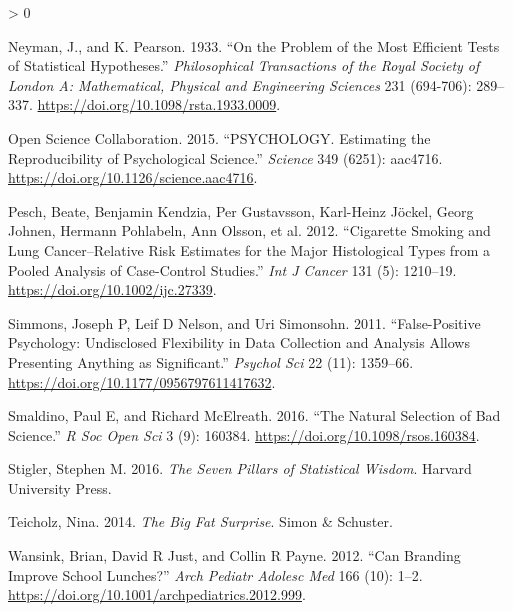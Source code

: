 \documentclass[
  12pt,
]{book}
\newlength{\cslhangindent}
\newenvironment{CSLReferences}[2] %
 {%
  \setlength{\parindent}{0pt}
  \ifodd #1 \everypar{\setlength{\hangindent}{\cslhangindent}}\ignorespaces\fi
  \ifnum #2 > 0
  \setlength{\parskip}{#2\baselineskip}
  \fi
 }%
 {}
\theoremstyle{definition}
\theoremstyle{definition}
\theoremstyle{definition}
\theoremstyle{remark}
\begin{document}
\begin{CSLReferences}{1}{0}
\leavevmode\hypertarget{ref-Neyman289}{}%
Neyman, J., and K. Pearson. 1933. {``On the Problem of the Most Efficient Tests of Statistical Hypotheses.''} \emph{Philosophical Transactions of the Royal Society of London A: Mathematical, Physical and Engineering Sciences} 231 (694-706): 289--337. \url{https://doi.org/10.1098/rsta.1933.0009}.

\leavevmode\hypertarget{ref-open:2015}{}%
Open Science Collaboration. 2015. {``PSYCHOLOGY. Estimating the Reproducibility of Psychological Science.''} \emph{Science} 349 (6251): aac4716. \url{https://doi.org/10.1126/science.aac4716}.

\leavevmode\hypertarget{ref-pesc:kend:gust:2012}{}%
Pesch, Beate, Benjamin Kendzia, Per Gustavsson, Karl-Heinz Jöckel, Georg Johnen, Hermann Pohlabeln, Ann Olsson, et al. 2012. {``Cigarette Smoking and Lung Cancer--Relative Risk Estimates for the Major Histological Types from a Pooled Analysis of Case-Control Studies.''} \emph{Int J Cancer} 131 (5): 1210--19. \url{https://doi.org/10.1002/ijc.27339}.

\leavevmode\hypertarget{ref-simm:nels:simo:2011}{}%
Simmons, Joseph P, Leif D Nelson, and Uri Simonsohn. 2011. {``False-Positive Psychology: Undisclosed Flexibility in Data Collection and Analysis Allows Presenting Anything as Significant.''} \emph{Psychol Sci} 22 (11): 1359--66. \url{https://doi.org/10.1177/0956797611417632}.

\leavevmode\hypertarget{ref-smal:mcel:2016}{}%
Smaldino, Paul E, and Richard McElreath. 2016. {``The Natural Selection of Bad Science.''} \emph{R Soc Open Sci} 3 (9): 160384. \url{https://doi.org/10.1098/rsos.160384}.

\leavevmode\hypertarget{ref-stig}{}%
Stigler, Stephen M. 2016. \emph{The Seven Pillars of Statistical Wisdom}. Harvard University Press.

\leavevmode\hypertarget{ref-teic:2014}{}%
Teicholz, Nina. 2014. \emph{The Big Fat Surprise}. Simon \& Schuster.

\leavevmode\hypertarget{ref-wans:just:payn:2012}{}%
Wansink, Brian, David R Just, and Collin R Payne. 2012. {``Can Branding Improve School Lunches?''} \emph{Arch Pediatr Adolesc Med} 166 (10): 1--2. \url{https://doi.org/10.1001/archpediatrics.2012.999}.

\end{CSLReferences}
\end{document}
